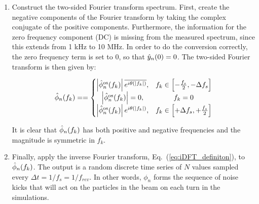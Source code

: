 \begin{enumerate}
    \item Construct the two-sided Fourier transform spectrum. First, create the negative components of the Fourier transform by taking the complex conjugate of the positive components. Furthermore, the information for the zero frequency component (DC) is missing from the measured spectrum, since this extends from  1 kHz to 10 MHz. In order to do the conversion correctly, the zero frequency term is set to 0, so that $\hat{y}_n(0)=0$. The two-sided Fourier transform is then given by:
    

    \begin{equation}
        \hat{\phi}_n(f_k) = = \left\{\begin{matrix}
   \left | \hat{\phi}_n^\mathrm{os}(f_k) \right | \overline{e^{{i}\theta (\mid f_k \mid)}}, & f_k \in \left [-\frac{f_s}{2}, -\Delta f_s \right] \\ 
    \left | \hat{\phi}_n^\mathrm{os}(f_k) \right | = 0, & f_k=0  \\
   \left | \hat{\phi}_n^\mathrm{os}(f_k) \right | e^{{i}\theta (\mid f_k \mid)}, & f_k \in \left [+ \Delta f_s, + \frac{f_s}{2} \right]  
    \end{matrix}\right.
    \end{equation}

    It is clear that $\hat{\phi}_n(f_k)$ has both positive and negative frequencies and the magnitude is symmetric in $f_k$.
    
    \item Finally, apply the inverse Fourier transform, Eq.~(\ref{eq:iDFT_definiton}), to $\hat{\phi}_n(f_k)$. The  output  is  a  random  discrete  time  series of $N$ values sampled every $\Delta t = 1/f_s=1/f_{rev}$. In other words, $\phi_n$ forms the sequence of noise kicks that will act on the particles in the beam on each turn in the simulations.

\end{enumerate} 



